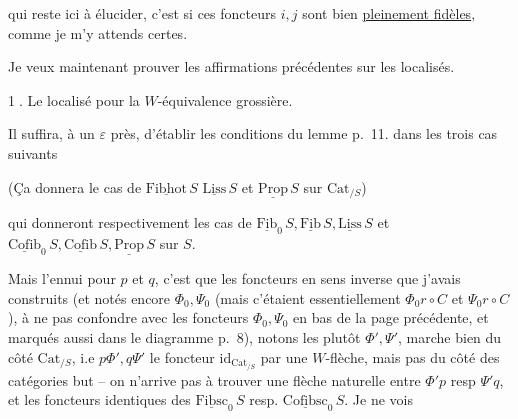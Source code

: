 qui reste ici à élucider, c'est si ces foncteurs $i,j$ sont bien \uline{pleinement fidèles}, comme je m'y attends certes.

Je veux maintenant prouver les affirmations précédentes sur les localisés.

\textcircled{1.} Le localisé pour la $W$-équivalence grossière.

Il suffira, à un $\varepsilon$ près, d'établir les conditions du lemme p.~11. dans les trois cas suivants


(Ça donnera le cas de $\underline{\mathrm{Fibhot}}\,S$ $\underline{\mathrm{Liss}}\,S$ et $\underline{\mathrm{Prop}}\,S$ sur $\mathrm{Cat}_{/S}$)


qui donneront respectivement les cas de  $\underline{\mathrm{Fib}}_0\,S,\underline{\mathrm{Fib}}\,S,\underline{\mathrm{Liss}}\,S$ et $\underline{\mathrm{Cofib}}_0\,S,\underline{\mathrm{Cofib}}\,S,\underline{\mathrm{Prop}}\,S$ sur $S$.

Mais l'ennui pour $p$ et $q$, c'est que les foncteurs en sens inverse que j'avais construits (et notés encore $\Phi_0,\Psi_0$ (mais c'étaient essentiellement $\Phi_0 r\circ C$ et $\Psi_0 r\circ C$), à ne pas confondre avec les foncteurs $\Phi_0,\Psi_0$ en bas de la page précédente, et marqués aussi dans le diagramme p.~8), notons les plutôt $\Phi',\Psi'$, marche bien du côté $\mathrm{Cat}_{/S}$, i.e $p\Phi',q\Psi'$  le foncteur $\mathrm{id}_{\mathrm{Cat}_{/S}}$ par une $W$-flèche, mais pas du côté des catégories but -- on n'arrive pas à trouver une flèche naturelle entre $\Phi'p$ resp $\Psi'q$, et les foncteurs identiques des $\underline{\mathrm{Fibsc}}_0\,S$ resp. $\underline{\mathrm{Cofibsc}}_0\,S$. Je ne vois

